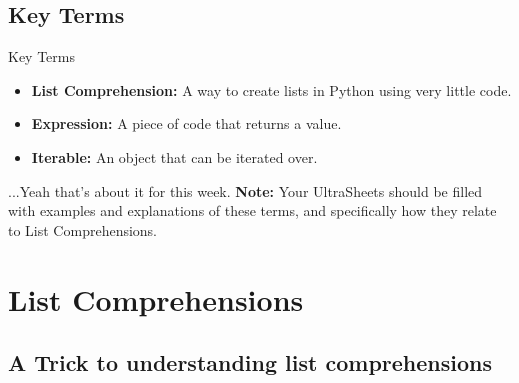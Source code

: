\documentclass[hyperref={colorlinks,citecolor=blue,linkcolor=blue,urlcolor=blue}]{beamer}
\begin{document}
\subsection{Key Terms}
\begin{frame}{Key Terms}
  \begin{itemize}
    \item \textbf{List Comprehension:} A way to create lists in Python using very little code. 
    \item \textbf{Expression:} A piece of code that returns a value.
    \item \textbf{Iterable:} An object that can be iterated over.
    \end{itemize}
    ...Yeah that's about it for this week. 
    \textbf{Note:} Your UltraSheets\texttrademark{} should be filled with examples and explanations of these terms, and specifically how they relate to List Comprehensions.
\end{frame}

\section{List Comprehensions}

\subsection{A Trick to understanding list comprehensions}
\end{document}
